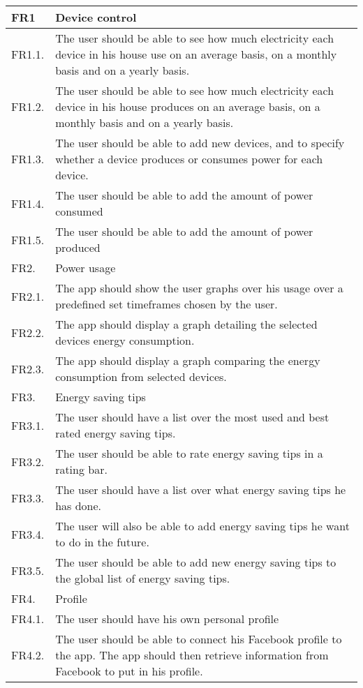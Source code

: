 \begin{longtable}{|l|p{14.5cm}|}
\hline
\cellcolor{lightgray}FR1 & \cellcolor{lightgray}Device control\\\hline
FR1.1. &The user should be able to see how much electricity each device in his house use on an average basis, on a monthly basis and on a yearly basis.\\\hline
FR1.2. &The user should be able to see how much electricity each device in his house produces on an average basis, on a monthly basis and on a yearly basis.\\\hline
FR1.3. &The user should be able to add new devices, and to specify whether a device produces or consumes power for each device.\\\hline
 FR1.4. &The user should be able to add the amount of power consumed\\\hline
FR1.5.& The user should be able to add the amount of power produced\\\hline
\cellcolor{lightgray}FR2. &\cellcolor{lightgray}Power usage\\\hline
FR2.1.& The app should show the user graphs over his usage over a predefined set timeframes chosen by the user.\\\hline
FR2.2.& The app should display a graph detailing the selected devices energy consumption.\\\hline
FR2.3.& The app should display a graph comparing the energy consumption from selected devices.\\\hline
\cellcolor{lightgray}FR3. &\cellcolor{lightgray}Energy saving tips\\\hline
FR3.1. &The user should have a list over the most used and best rated energy saving tips.\\\hline
FR3.2. &The user should be able to rate energy saving tips in a rating bar.\\\hline
FR3.3. &The user should have a list over what energy saving tips he has done.\\\hline
FR3.4.& The user will also be able to add energy saving tips he want to do in the future.\\\hline
FR3.5.& The user should be able to add new energy saving tips to the global list of energy saving tips.\\\hline
\cellcolor{lightgray}FR4.& \cellcolor{lightgray}Profile\\\hline
FR4.1.& The user should have his own personal profile\\\hline
FR4.2.& The user should be able to connect his Facebook profile to the app. The app should then retrieve information from Facebook to put in his profile.\\\hline

\end{longtable}
